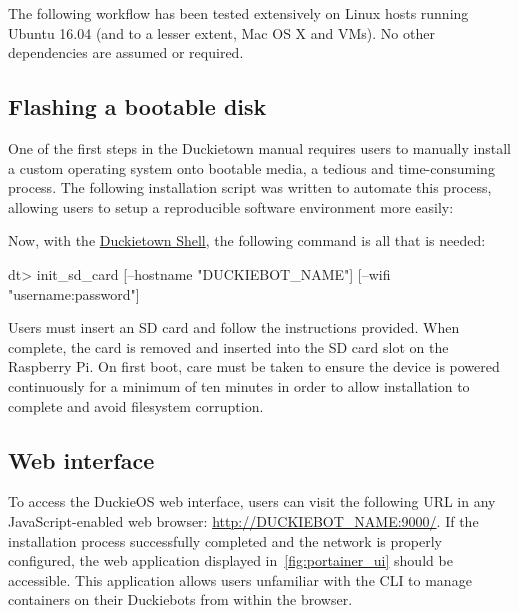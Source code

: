 \documentclass[12pt,initial,twoside,maitrise]{dms}
\numberwithin{equation}{section}
\numberwithin{table}{chapter}
\numberwithin{figure}{chapter}
\begin{document}
\noindent The following workflow has been tested extensively on Linux hosts running Ubuntu 16.04 (and to a lesser extent, Mac OS X and VMs). No other dependencies are assumed or required.

\subsection{Flashing a bootable disk}

One of the first steps in the Duckietown manual requires users to manually install a custom operating system onto bootable media, a tedious and time-consuming process. The following installation script was written to automate this process, allowing users to setup a reproducible software environment more easily:

%
Now, with the \href{https://github.com/duckietown/duckietown-shell}{Duckietown Shell}, the following command is all that is needed:
%
\begin{dtslisting}
dt> init_sd_card [--hostname "DUCKIEBOT_NAME"] [--wifi "username:password"]
\end{dtslisting}
%
Users must insert an SD card and follow the instructions provided. When complete, the card is removed and inserted into the SD card slot on the Raspberry Pi. On first boot, care must be taken to ensure the device is powered continuously for a minimum of ten minutes in order to allow installation to complete and avoid filesystem corruption.

\subsection{Web interface}

To access the DuckieOS web interface, users can visit the following URL in any JavaScript-enabled web browser: \url{http://DUCKIEBOT_NAME:9000/}. If the installation process successfully completed and the network is properly configured, the web application displayed in~\autoref{fig:portainer_ui} should be accessible. This application allows users unfamiliar with the CLI to manage containers on their Duckiebots from within the browser.
\end{document}
